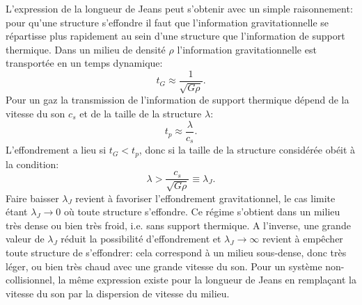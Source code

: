 L'expression de la longueur de Jeans peut s'obtenir avec un simple raisonnement: pour qu'une structure s'effondre il faut que l'information gravitationnelle se répartisse plus rapidement au sein d'une structure que l'information de support thermique. Dans un milieu de densité $\rho$ l'information gravitationnelle est transportée en un temps dynamique:
\begin{equation}
t_G\approx \frac{1}{\sqrt{G\rho}}.
\end{equation}
Pour un gaz la transmission de l'information de support thermique dépend de la vitesse du son $c_s$ et de la taille de la structure $\lambda$:
\begin{equation}
t_p\approx\frac{\lambda}{c_s}.
\end{equation}
L'effondrement a lieu si $t_G<t_p$, donc si la taille de la structure considérée obéit à la condition:
\begin{equation}
\lambda >\frac{c_s}{\sqrt{G\rho}}\equiv \lambda_J.
\end{equation}
Faire baisser $\lambda_J$ revient à favoriser l'effondrement gravitationnel, le cas limite étant $\lambda_J \rightarrow 0$ où toute structure s'effondre. Ce régime s'obtient dans un milieu très dense ou bien très froid, i.e. sans support thermique.  A l'inverse, une grande valeur de $\lambda_J$ réduit la possibilité d'effondrement et $\lambda_J\rightarrow\infty$ revient à empêcher toute structure de s'effondrer: cela correspond à un milieu sous-dense, donc très léger, ou bien très chaud avec une grande vitesse du son. Pour un système non-collisionnel, la même expression existe pour la longueur de Jeans en remplaçant la vitesse du son par la dispersion de vitesse du milieu.


